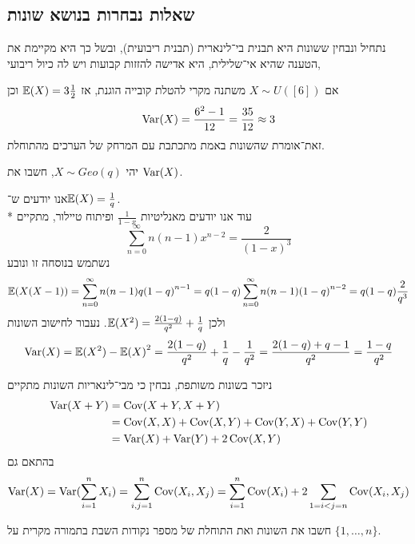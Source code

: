 \subsection{שאלות נבחרות בנושא שונות}
נתחיל ונבחין ששונות היא תבנית בי־לינארית (תבנית ריבועית), ובשל כך היא מקיימת את הטענה שהיא אי־שלילית, היא אדישה להזזות קבועות ויש לה כיול ריבועי,
\begin{example}
	אם $X \sim U([6])$ משתנה מקרי להטלת קובייה הוגנת, אז $\mathbb{E}(X) = 3 \frac{1}{2}$ וכן
	\[
		\operatorname{Var}(X) = \frac{6^2 - 1}{12} = \frac{35}{12} \approx 3
	\]
	זאת־אומרת שהשונות באמת מתכתבת עם המרחק של הערכים מהתוחלת.
\end{example}
\begin{exercise}
	יהי $X \sim Geo(q)$, חשבו את $\operatorname{Var}(X)$.
\end{exercise}
\begin{solution}
	אנו יודעים ש־$\mathbb{E}(X) = \frac{1}{q}$. \\*
	עוד אנו יודעים מאנליטיות $\frac{1}{1 - x}$ ופיתוח טיילור, מתקיים
	\[
		\sum_{n = 0}^{\infty} n (n - 1) x^{n - 2} = \frac{2}{{(1 - x)}^3}
	\]
	נשתמש בנוסחה זו ונובע
	\[
		\mathbb{E}(X(X - 1))
		= \sum_{n = 0}^{\infty} n (n - 1) q {(1 - q)}^{n - 1}
		= q (1 - q) \sum_{n = 0}^{\infty} n (n - 1) {(1 - q)}^{n - 2}
		= q (1 - q) \frac{2}{q^3}
	\]
	ולכן $\mathbb{E}(X^2) = \frac{2(1 - q)}{q^2} + \frac{1}{q}$.
	נעבור לחישוב השונות
	\[
		\operatorname{Var}(X)
		= \mathbb{E}(X^2) - {\mathbb{E}(X)}^2
		= \frac{2(1 - q)}{q^2} + \frac{1}{q} - \frac{1}{q^2}
		= \frac{2(1 - q) + q - 1}{q^2}
		= \frac{1 - q}{q^2}
	\]
\end{solution}
ניזכר בשונות משותפת, נבחין כי מבי־לינאריות השונות מתקיים
\begin{align*}
	\operatorname{Var}(X + Y)
	& = \operatorname{Cov}(X + Y, X + Y) \\
	& = \operatorname{Cov}(X, X) + \operatorname{Cov}(X, Y) + \operatorname{Cov}(Y, X) + \operatorname{Cov}(Y, Y) \\
	& = \operatorname{Var}(X) + \operatorname{Var}(Y) + 2 \operatorname{Cov}(X, Y)
\end{align*}
בהתאם גם
\[
	\operatorname{Var}(X)
	= \operatorname{Var}(\sum_{i = 1}^{n} X_i)
	= \sum_{i, j = 1}^{n} \operatorname{Cov}(X_i, X_j)
	= \sum_{i = 1}^{n} \operatorname{Cov}(X_i) + 2 \sum_{1 = i < j = n} \operatorname{Cov}(X_i, X_j)
\]
\begin{exercise}
	חשבו את השונות ואת התוחלת של מספר נקודות השבת בתמורה מקרית על $\{1, \dots, n\}$.
\end{exercise}

